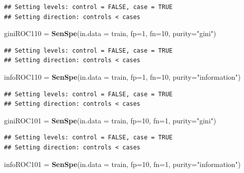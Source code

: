 \documentclass[
]{book}
\newenvironment{Shaded}{\begin{snugshade}}{\end{snugshade}}
\newcommand{\AttributeTok}[1]{\textcolor[rgb]{0.13,0.29,0.53}{#1}}
\newcommand{\DecValTok}[1]{\textcolor[rgb]{0.00,0.00,0.81}{#1}}
\newcommand{\FunctionTok}[1]{\textcolor[rgb]{0.13,0.29,0.53}{\textbf{#1}}}
\newcommand{\NormalTok}[1]{#1}
\newcommand{\OtherTok}[1]{\textcolor[rgb]{0.56,0.35,0.01}{#1}}
\newcommand{\StringTok}[1]{\textcolor[rgb]{0.31,0.60,0.02}{#1}}
\begin{document}
\begin{verbatim}
## Setting levels: control = FALSE, case = TRUE
## Setting direction: controls < cases
\end{verbatim}

\begin{Shaded}
\begin{Highlighting}[]
\NormalTok{giniROC110 }\OtherTok{=} \FunctionTok{SenSpe}\NormalTok{(}\AttributeTok{in.data =}\NormalTok{ train, }\AttributeTok{fp=}\DecValTok{1}\NormalTok{, }\AttributeTok{fn=}\DecValTok{10}\NormalTok{, }\AttributeTok{purity=}\StringTok{"gini"}\NormalTok{)}
\end{Highlighting}
\end{Shaded}

\begin{verbatim}
## Setting levels: control = FALSE, case = TRUE
## Setting direction: controls < cases
\end{verbatim}

\begin{Shaded}
\begin{Highlighting}[]
\NormalTok{infoROC110 }\OtherTok{=} \FunctionTok{SenSpe}\NormalTok{(}\AttributeTok{in.data =}\NormalTok{ train, }\AttributeTok{fp=}\DecValTok{1}\NormalTok{, }\AttributeTok{fn=}\DecValTok{10}\NormalTok{, }\AttributeTok{purity=}\StringTok{"information"}\NormalTok{)}
\end{Highlighting}
\end{Shaded}

\begin{verbatim}
## Setting levels: control = FALSE, case = TRUE
## Setting direction: controls < cases
\end{verbatim}

\begin{Shaded}
\begin{Highlighting}[]
\NormalTok{giniROC101 }\OtherTok{=} \FunctionTok{SenSpe}\NormalTok{(}\AttributeTok{in.data =}\NormalTok{ train, }\AttributeTok{fp=}\DecValTok{10}\NormalTok{, }\AttributeTok{fn=}\DecValTok{1}\NormalTok{, }\AttributeTok{purity=}\StringTok{"gini"}\NormalTok{)}
\end{Highlighting}
\end{Shaded}

\begin{verbatim}
## Setting levels: control = FALSE, case = TRUE
## Setting direction: controls < cases
\end{verbatim}

\begin{Shaded}
\begin{Highlighting}[]
\NormalTok{infoROC101 }\OtherTok{=} \FunctionTok{SenSpe}\NormalTok{(}\AttributeTok{in.data =}\NormalTok{ train, }\AttributeTok{fp=}\DecValTok{10}\NormalTok{, }\AttributeTok{fn=}\DecValTok{1}\NormalTok{, }\AttributeTok{purity=}\StringTok{"information"}\NormalTok{)}
\end{Highlighting}
\end{Shaded}
\end{document}
